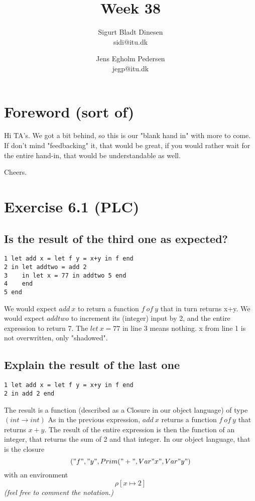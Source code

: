 \documentclass[a4paper]{article}
\begin{document}
\title{Week 38}
\author{Sigurt Bladt Dinesen \\sidi{@}itu.dk \and Jens Egholm Pedersen \\jegp{@}itu.dk}
\maketitle
\section*{Foreword (sort of)}
Hi TA's. We got a bit behind, so this is our "blank hand in" with more to come. If don't mind "feedbacking" it, that would be great, if you would rather wait for the entire hand-in, that would be understandable as well.

Cheers.

\section*{Exercise 6.1 (PLC)}
\subsection*{Is the result of the third one as expected?}
\begin{verbatim}
1 let add x = let f y = x+y in f end
2 in let addtwo = add 2
3    in let x = 77 in addtwo 5 end
4    end
5 end
\end{verbatim}
We would expect $add\ x$ to return a function $f\ of\ y$ that in turn returns x+y.
We would expect $addtwo$ to increment its (integer) input by 2, and the entire expression
to return 7.
The $let\ x = 77$ in line 3 means nothing. x from line 1 is not overwritten, only "shadowed".

\subsection*{Explain the result of the last one}
\begin{verbatim}
1 let add x = let f y = x+y in f end
2 in add 2 end
\end{verbatim}
The result is a function (described as a Closure in our object language) of
type $(int \to int)$ As in the previous expression, $add\ x$ returns a function
$f\ of\ y$ that returns $x+y$. The result of the entire expression is then the
function of an integer, that returns the sum of 2 and that integer.
In our object language, that is the closure
$$("f","y", Prim("+", Var "x", Var "y")$$
with an environment $$\rho [x \mapsto 2]$$
\textit{\small{(feel free to comment the notation.)}}
\end{document}
